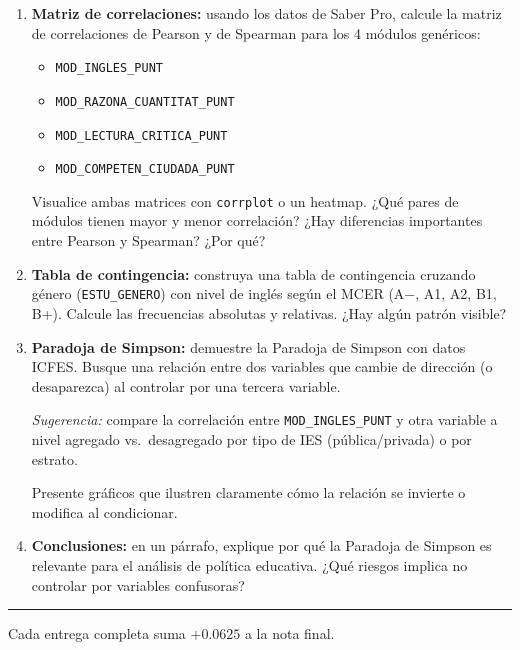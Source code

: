 \documentclass[11pt, a4paper]{article}
\begin{document}
\begin{enumerate}[label=\alph*)]
  \item \textbf{Matriz de correlaciones:} usando los datos de Saber Pro,
        calcule la matriz de correlaciones de
        Pearson y de Spearman para los 4 m\'odulos gen\'ericos:
        \begin{itemize}
          \item \texttt{MOD\_INGLES\_PUNT}
          \item \texttt{MOD\_RAZONA\_CUANTITAT\_PUNT}
          \item \texttt{MOD\_LECTURA\_CRITICA\_PUNT}
          \item \texttt{MOD\_COMPETEN\_CIUDADA\_PUNT}
        \end{itemize}
        Visualice ambas matrices con \texttt{corrplot} o un heatmap.
        ¿Qu\'e pares de m\'odulos tienen mayor y menor correlaci\'on?
        ¿Hay diferencias importantes entre Pearson y Spearman? ¿Por qu\'e?

  \item \textbf{Tabla de contingencia:} construya una tabla de contingencia
        cruzando g\'enero (\texttt{ESTU\_GENERO}) con nivel de ingl\'es seg\'un el MCER
        (A$-$, A1, A2, B1, B+). Calcule las frecuencias absolutas y relativas.
        ¿Hay alg\'un patr\'on visible?

  \item \textbf{Paradoja de Simpson:} demuestre la Paradoja de Simpson con datos
        ICFES. Busque una relaci\'on entre dos variables que cambie de direcci\'on
        (o desaparezca) al controlar por una tercera variable.

        \textit{Sugerencia:} compare la correlaci\'on entre \texttt{MOD\_INGLES\_PUNT}
        y otra variable a nivel agregado vs.\ desagregado por tipo de IES
        (p\'ublica/privada) o por estrato.

        Presente gr\'aficos que ilustren claramente c\'omo la relaci\'on se invierte
        o modifica al condicionar.

  \item \textbf{Conclusiones:} en un p\'arrafo, explique por qu\'e la Paradoja de
        Simpson es relevante para el an\'alisis de pol\'itica educativa. ¿Qu\'e
        riesgos implica no controlar por variables confusoras?
\end{enumerate}

\vspace{10pt}
\rule{\linewidth}{0.4pt}
\begin{center}
{\small Cada entrega completa suma $+0.0625$ a la nota final.}
\end{center}
\end{document}
